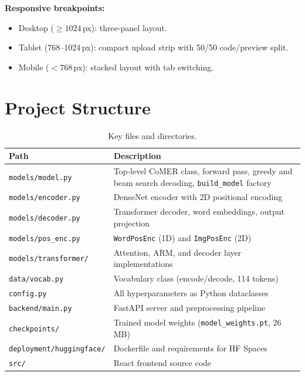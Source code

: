 \documentclass[11pt,a4paper]{article}
\begin{document}
\textbf{Responsive breakpoints:}
\begin{itemize}[nosep]
  \item Desktop ($\geq 1024$\,px): three-panel layout.
  \item Tablet (768--1024\,px): compact upload strip with 50/50 code/preview split.
  \item Mobile ($< 768$\,px): stacked layout with tab switching.
\end{itemize}

\section{Project Structure}
\label{sec:structure}

\begin{table}[H]
\centering
\caption{Key files and directories.}
\label{tab:files}
\begin{tabular}{p{5.5cm}p{8cm}}
\toprule
\textbf{Path} & \textbf{Description} \\
\midrule
\texttt{models/model.py}          & Top-level CoMER class, forward pass, greedy and beam search decoding, \texttt{build\_model} factory \\
\texttt{models/encoder.py}        & DenseNet encoder with 2D positional encoding \\
\texttt{models/decoder.py}        & Transformer decoder, word embeddings, output projection \\
\texttt{models/pos\_enc.py}       & \texttt{WordPosEnc} (1D) and \texttt{ImgPosEnc} (2D) \\
\texttt{models/transformer/}      & Attention, ARM, and decoder layer implementations \\
\texttt{data/vocab.py}            & Vocabulary class (encode/decode, 114 tokens) \\
\texttt{config.py}                & All hyperparameters as Python dataclasses \\
\texttt{backend/main.py}          & FastAPI server and preprocessing pipeline \\
\texttt{checkpoints/}             & Trained model weights (\texttt{model\_weights.pt}, 26\,MB) \\
\texttt{deployment/huggingface/}  & Dockerfile and requirements for HF Spaces \\
\texttt{src/}                     & React frontend source code \\
\bottomrule
\end{tabular}
\end{table}
\end{document}
